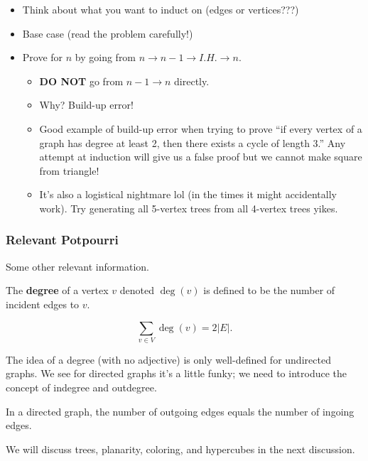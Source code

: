 \begin{itemize}
    \item Think about what you want to induct on (edges or vertices???)
    \item Base case (read the problem carefully!)
    \item Prove for $n$ by going from $n \to n-1 \to I.H. \to n$. 
    \begin{itemize}
        \item \textbf{DO NOT} go from $n-1 \to n$ directly.
        \item Why? Build-up error!
        \item Good example of build-up error when trying to prove ``if every vertex of a graph has degree at least 2, then there exists a cycle of length 3.'' Any attempt at induction will give us a false proof but we cannot make square from triangle! 
        \item It's also a logistical nightmare lol (in the times it might accidentally work). Try generating all 5-vertex trees from all 4-vertex trees yikes. 
    \end{itemize}
\end{itemize}

\subsubsection{Relevant Potpourri}

Some other relevant information. 

\begin{definition}[Degree]
    The \textbf{degree} of a vertex $v$ denoted $\deg(v)$ is defined to be the number of incident edges to $v$. 
\end{definition}

\begin{lemma}[Handshake]
    \[ \sum_{v \in V} \deg(v) = 2|E|. \]
\end{lemma}

The idea of a degree (with no adjective) is only well-defined for undirected graphs. We see for directed graphs it's a little funky; we need to introduce the concept of indegree and outdegree. 

In a directed graph, the number of outgoing edges equals the number of ingoing edges. 

We will discuss trees, planarity, coloring, and hypercubes in the next discussion. 